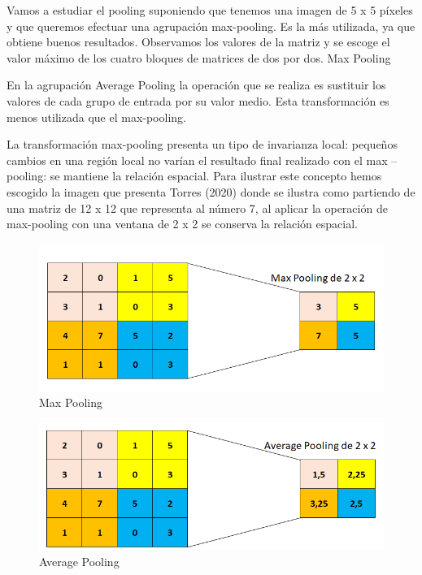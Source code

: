 \documentclass[
  a4paper,
  DIV=11,
  numbers=noendperiod]{scrreprt}
\begin{document}
Vamos a estudiar el pooling suponiendo que tenemos una imagen de 5 x 5
píxeles y que queremos efectuar una agrupación max-pooling. Es la más
utilizada, ya que obtiene buenos resultados. Observamos los valores de
la matriz y se escoge el valor máximo de los cuatro bloques de matrices
de dos por dos. Max Pooling

En la agrupación Average Pooling la operación que se realiza es
sustituir los valores de cada grupo de entrada por su valor medio. Esta
transformación es menos utilizada que el max-pooling.

La transformación max-pooling presenta un tipo de invarianza local:
pequeños cambios en una región local no varían el resultado final
realizado con el max -- pooling: se mantiene la relación espacial. Para
ilustrar este concepto hemos escogido la imagen que presenta Torres
(2020) donde se ilustra como partiendo de una matriz de 12 x 12 que
representa al número 7, al aplicar la operación de max-pooling con una
ventana de 2 x 2 se conserva la relación espacial.

\begin{figure}

{\centering \includegraphics{imagenes/capitulo1/max_pooling.png}

}

\caption{\label{fig-max-pooling}Max Pooling}

\end{figure}

\begin{figure}

{\centering \includegraphics{imagenes/capitulo1/average_pooling.png}

}

\caption{\label{fig-average-pooling}Average Pooling}

\end{figure}
\end{document}

